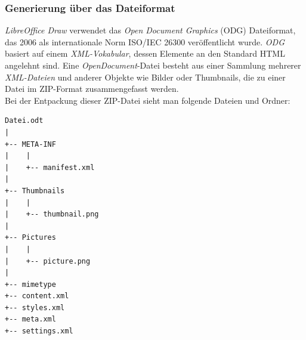 \noindent
\subsubsection{Generierung über das Dateiformat}
\hon{}




\noindent	
\textit{LibreOffice Draw} verwendet das \textit{Open Document Graphics} (ODG) Dateiformat, das 2006 als internationale Norm ISO/IEC 26300 veröffentlicht wurde. 
\textit{ODG} basiert auf einem \textit{XML-Vokabular}, dessen Elemente an den Standard HTML angelehnt sind.
Eine \textit{OpenDocument}-Datei besteht aus einer Sammlung mehrerer \textit{XML-Dateien} und anderer Objekte wie Bilder oder Thumbnails, die zu einer Datei im ZIP-Format zusammengefasst werden.
\\
Bei der Entpackung dieser ZIP-Datei sieht man folgende Dateien und Ordner:
\begin{verbatim}
Datei.odt
|
+-- META-INF
|    |
|    +-- manifest.xml
|
+-- Thumbnails
|    |
|    +-- thumbnail.png
|
+-- Pictures
|    |
|    +-- picture.png
|
+-- mimetype
+-- content.xml
+-- styles.xml
+-- meta.xml
+-- settings.xml
\end{verbatim}

